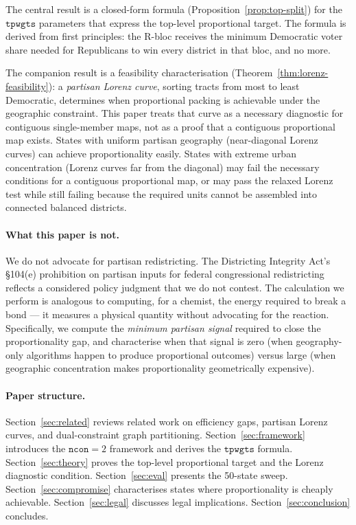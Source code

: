 The central result is a closed-form formula (Proposition~\ref{prop:top-split})
for the $\mathtt{tpwgts}$ parameters that express the top-level proportional
target.
The formula is derived from first principles: the R-bloc receives the minimum
Democratic voter share needed for Republicans to win every district in that bloc,
and no more.

The companion result is a feasibility characterisation (Theorem~\ref{thm:lorenz-feasibility}):
a \emph{partisan Lorenz curve}, sorting tracts from most to least Democratic,
determines when proportional packing is achievable under the geographic
constraint. This paper treats that curve as a necessary diagnostic for
contiguous single-member maps, not as a proof that a contiguous proportional
map exists.
States with uniform partisan geography (near-diagonal Lorenz curves) can
achieve proportionality easily.
States with extreme urban concentration (Lorenz curves far from the diagonal)
may fail the necessary conditions for a contiguous proportional map, or may pass
the relaxed Lorenz test while still failing because the required units cannot
be assembled into connected balanced districts.

\paragraph{What this paper is not.}
We do not advocate for partisan redistricting.
The Districting Integrity Act's \S104(e) prohibition on partisan inputs for
federal congressional redistricting reflects a considered policy judgment that
we do not contest.
The calculation we perform is analogous to computing, for a chemist, the energy
required to break a bond --- it measures a physical quantity without advocating
for the reaction.
Specifically, we compute the \emph{minimum partisan signal} required to close
the proportionality gap, and characterise when that signal is zero (when
geography-only algorithms happen to produce proportional outcomes) versus
large (when geographic concentration makes proportionality geometrically expensive).

\paragraph{Paper structure.}
Section~\ref{sec:related} reviews related work on efficiency gaps, partisan
Lorenz curves, and dual-constraint graph partitioning.
Section~\ref{sec:framework} introduces the $\mathtt{ncon}=2$ framework and
derives the $\mathtt{tpwgts}$ formula.
Section~\ref{sec:theory} proves the top-level proportional target and the
Lorenz diagnostic condition.
Section~\ref{sec:eval} presents the 50-state sweep.
Section~\ref{sec:compromise} characterises states where proportionality is
cheaply achievable.
Section~\ref{sec:legal} discusses legal implications.
Section~\ref{sec:conclusion} concludes.
